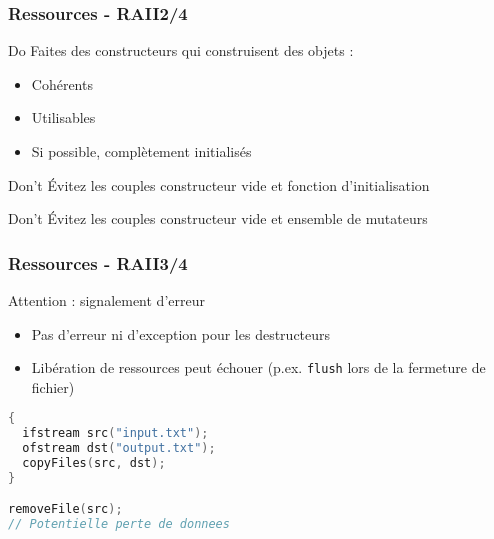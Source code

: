 \documentclass[C++.tex]{subfiles}
\begin{document}
\begin{frame}
	\frametitle{Ressources - RAII\titlehfill{}2/4}
	\begin{exampleblock}{Do}
		Faites des constructeurs qui construisent des objets :
		\begin{itemize}
			\item Cohérents
			\item Utilisables
			\item Si possible, complètement initialisés
		\end{itemize}
	\end{exampleblock}

	\begin{alertblock}{Don't}
		Évitez les couples constructeur \og vide\fg{} et fonction d'initialisation

	\end{alertblock}

	\begin{alertblock}{Don't}
		Évitez les couples constructeur \og vide\fg{} et ensemble de mutateurs

	\end{alertblock}
\end{frame}

\begin{frame}[fragile]
	\frametitle{Ressources - RAII\titlehfill{}3/4}
	\begin{alertblock}{Attention : signalement d'erreur}
		\begin{itemize}
			\item Pas d'erreur ni d'exception pour les destructeurs
			\item Libération de ressources peut échouer (p.ex. \lstinline|flush| lors de la fermeture de fichier)

		\end{itemize}
	\end{alertblock}

	\begin{lstlisting}[language=C++]
{
  ifstream src("input.txt");
  ofstream dst("output.txt");
  copyFiles(src, dst);
}

removeFile(src);
// Potentielle perte de donnees\end{lstlisting}

\end{frame}
\end{document}
